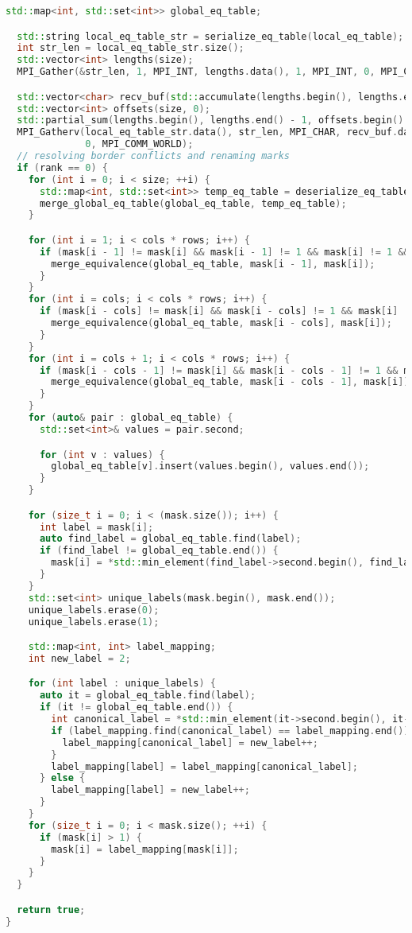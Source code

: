 \documentclass[a4paper,12pt]{article}
\begin{document}
\begin{lstlisting}[language=C++,caption={Фрагмент MPI-версии}]
  std::map<int, std::set<int>> global_eq_table;

  std::string local_eq_table_str = serialize_eq_table(local_eq_table);
  int str_len = local_eq_table_str.size();
  std::vector<int> lengths(size);
  MPI_Gather(&str_len, 1, MPI_INT, lengths.data(), 1, MPI_INT, 0, MPI_COMM_WORLD);

  std::vector<char> recv_buf(std::accumulate(lengths.begin(), lengths.end(), 0));
  std::vector<int> offsets(size, 0);
  std::partial_sum(lengths.begin(), lengths.end() - 1, offsets.begin() + 1);
  MPI_Gatherv(local_eq_table_str.data(), str_len, MPI_CHAR, recv_buf.data(), lengths.data(), offsets.data(), MPI_CHAR,
              0, MPI_COMM_WORLD);
  // resolving border conflicts and renaming marks
  if (rank == 0) {
    for (int i = 0; i < size; ++i) {
      std::map<int, std::set<int>> temp_eq_table = deserialize_eq_table(std::string(&recv_buf[offsets[i]], lengths[i]));
      merge_global_eq_table(global_eq_table, temp_eq_table);
    }

    for (int i = 1; i < cols * rows; i++) {
      if (mask[i - 1] != mask[i] && mask[i - 1] != 1 && mask[i] != 1 && i % cols != 0) {
        merge_equivalence(global_eq_table, mask[i - 1], mask[i]);
      }
    }
    for (int i = cols; i < cols * rows; i++) {
      if (mask[i - cols] != mask[i] && mask[i - cols] != 1 && mask[i] != 1) {
        merge_equivalence(global_eq_table, mask[i - cols], mask[i]);
      }
    }
    for (int i = cols + 1; i < cols * rows; i++) {
      if (mask[i - cols - 1] != mask[i] && mask[i - cols - 1] != 1 && mask[i] != 1 && i % cols != 0) {
        merge_equivalence(global_eq_table, mask[i - cols - 1], mask[i]);
      }
    }
    for (auto& pair : global_eq_table) {
      std::set<int>& values = pair.second;

      for (int v : values) {
        global_eq_table[v].insert(values.begin(), values.end());
      }
    }

    for (size_t i = 0; i < (mask.size()); i++) {
      int label = mask[i];
      auto find_label = global_eq_table.find(label);
      if (find_label != global_eq_table.end()) {
        mask[i] = *std::min_element(find_label->second.begin(), find_label->second.end());
      }
    }
    std::set<int> unique_labels(mask.begin(), mask.end());
    unique_labels.erase(0);
    unique_labels.erase(1);

    std::map<int, int> label_mapping;
    int new_label = 2;

    for (int label : unique_labels) {
      auto it = global_eq_table.find(label);
      if (it != global_eq_table.end()) {
        int canonical_label = *std::min_element(it->second.begin(), it->second.end());
        if (label_mapping.find(canonical_label) == label_mapping.end()) {
          label_mapping[canonical_label] = new_label++;
        }
        label_mapping[label] = label_mapping[canonical_label];
      } else {
        label_mapping[label] = new_label++;
      }
    }
    for (size_t i = 0; i < mask.size(); ++i) {
      if (mask[i] > 1) {
        mask[i] = label_mapping[mask[i]];
      }
    }
  }

  return true;
}

\end{lstlisting}
\end{document}
